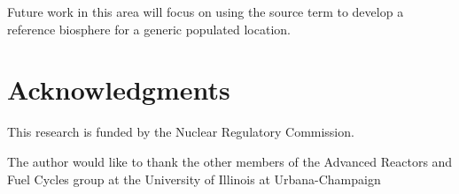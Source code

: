 \documentclass{anstrans}
\begin{document}
Future work in this area will focus on using the source term to develop a reference biosphere for a generic populated location.



\section{Acknowledgments}
This research is funded by the Nuclear Regulatory Commission.

The author would like to thank the other members of the Advanced Reactors and Fuel Cycles group at the University of Illinois at Urbana-Champaign




\end{document}
